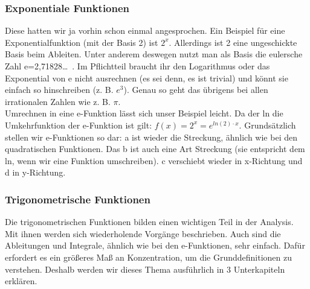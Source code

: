 	\subsubsection{Exponentiale Funktionen}
		Diese hatten wir ja vorhin schon einmal angesprochen. Ein Beispiel für eine
		Exponentialfunktion (mit der Basis 2) ist \(2^x\). Allerdings ist 2 eine
		ungeschickte Basis beim Ableiten. Unter anderem deswegen nutzt man als Basis
		die eulersche Zahl e=2,71828\ldots \ . Im Pflichtteil braucht ihr den
		Logarithmus oder das Exponential von e nicht ausrechnen (es sei denn, es ist
		trivial) und könnt sie einfach so hinschreiben (z. B. \(e^3\)). Genau so geht
		das übrigens bei allen irrationalen Zahlen wie z. B. \(\pi\).\\
		Umrechnen in eine e-Funktion lässt sich unser Beispiel leicht. Da der ln die
		Umkehrfunktion der e-Funktion ist gilt: \(f(x)=2^x=e^{ln(2)\cdot x}\).
		Grundsätzlich stellen wir e-Funktionen so dar:
		\formel{\[f(x)=a \cdot e^{b(x-c)}+d\]}
		a ist wieder die Streckung, ähnlich wie bei den quadratischen Funktionen. Das
		b ist auch eine Art Streckung (sie entspricht dem ln, wenn wir eine Funktion
		umschreiben). c verschiebt wieder in x-Richtung und d in y-Richtung.\\

	\subsubsection{Trigonometrische Funktionen}
		Die trigonometrischen Funktionen bilden einen wichtigen Teil in der Analysis.
		Mit ihnen werden sich wiederholende Vorgänge beschrieben. Auch sind die
		Ableitungen und Integrale, ähnlich wie bei den e-Funktionen, sehr einfach.
		Dafür erfordert es ein größeres Maß an Konzentration, um die Grunddefinitionen
		zu verstehen. Deshalb werden wir dieses Thema ausführlich in 3 Unterkapiteln
		erklären.
